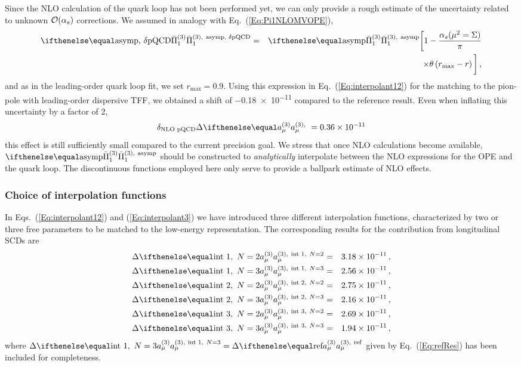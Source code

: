 Since the NLO calculation of the quark loop has not been performed yet, we can only provide a rough estimate of the uncertainty related to unknown ${\cal O}(\alpha_s)$ corrections. We assumed in analogy with Eq.~(\ref{Eq:Pi1NLOMVOPE}),
\begin{eqnarray}
\Pipion[\text{asymp, $\delta$pQCD}] & = & \Pipion[\text{asymp}] \bigg[1-\frac{\alpha_s(\mu^2=\Sigma)}{\pi} \nonumber\\
&&\qquad\times\theta\left(r_\text{max} - r\right)\bigg]\,,
\label{Eq:Pi1NLOpQCD}
\end{eqnarray}
and as in the leading-order quark loop fit, we set $r_\text{max}=0.9$. Using this expression in Eq.~(\ref{Eq:interpolant12}) for the matching to the pion-pole with leading-order dispersive TFF, we obtained a shift of \num{-0.18e-11} compared to the reference result. Even when inflating this uncertainty by a factor of 2,
\begin{equation}
\delta_\text{NLO pQCD} \Delta \aPion = \num{0.36e-11}
\end{equation}
this effect is still sufficiently small compared to the current precision goal. We stress that once NLO calculations become available, $\Pipion[\text{asymp}]$ should be constructed to \emph{analytically} interpolate between the NLO expressions for the OPE and the quark loop. The discontinuous functions employed here only serve to provide a ballpark estimate of NLO effects.


\subsubsection{Choice of interpolation functions}
\label{Sec:NumInt}
In Eqs.~(\ref{Eq:interpolant12}) and (\ref{Eq:interpolant3}) we have introduced three different interpolation functions, characterized by two or three free parameters to be matched to the low-energy representation. The corresponding results for the contribution from longitudinal SCDs are
\begin{eqnarray}
\Delta \aPion[\text{int 1},\ N=2] & = & \num{3.18e-11}\,, \nonumber \\
\Delta \aPion[\text{int 1},\ N=3] & = & \num{2.56e-11}\,, \nonumber \\
\Delta \aPion[\text{int 2},\ N=2] & = & \num{2.75e-11}\,, \nonumber \\
\Delta \aPion[\text{int 2},\ N=3] & = & \num{2.16e-11}\,, \nonumber \\
\Delta \aPion[\text{int 3},\ N=2] & = & \num{2.69e-11}\,, \nonumber \\
\Delta \aPion[\text{int 3},\ N=3] & = & \num{1.94e-11}\,,
\label{Eq:NumInterpolant}
\end{eqnarray}
where $\Delta \aPion[\text{int 1},\ N=3] = \Delta \aPion[\text{ref}]$ given by Eq.~(\ref{Eq:refRes}) has been included for completeness.

